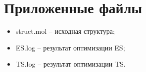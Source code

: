 \section{Приложенные файлы}
\begin{itemize}
    \item struct.mol – исходная структура;
    \item ES.log – результат оптимизации ES;
    \item TS.log – результат оптимизации TS.
\end{itemize}{}